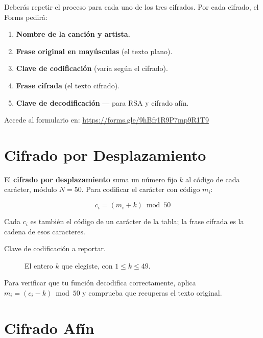 \documentclass[12pt, oneside]{article}
\begin{document}
Deberás repetir el proceso para cada uno de los tres cifrados.  Por
cada cifrado, el Forms pedirá:

\begin{enumerate}
  \item \textbf{Nombre de la canción y artista.}
  \item \textbf{Frase original en mayúsculas} (el texto plano).
  \item \textbf{Clave de codificación} (varía según el cifrado).
  \item \textbf{Frase cifrada} (el texto cifrado).
  \item \textbf{Clave de decodificación} — para RSA y cifrado afín.
\end{enumerate}

Accede al formulario en:\quad
\url{https://forms.gle/9hBfr1R9P7mp9R1T9}

\newpage
\section{Cifrado por Desplazamiento}

El \textbf{cifrado por desplazamiento} suma un número fijo $k$ al código
de cada carácter, módulo $N = 50$.  Para codificar el carácter con
código $m_i$:

\[
  c_i = (m_i + k) \bmod 50
\]

Cada $c_i$ es también el código de un carácter de la tabla; la
frase cifrada es la cadena de esos caracteres.

\begin{description}
  \item[Clave de codificación a reportar.] El entero $k$ que elegiste,
        con $1 \le k \le 49$.
\end{description}

\begin{consejo}
  Para verificar que tu función decodifica correctamente, aplica
  $m_i = (c_i - k) \bmod 50$ y comprueba que recuperas el texto
  original.
\end{consejo}

\newpage
\section{Cifrado Afín}
\end{document}
